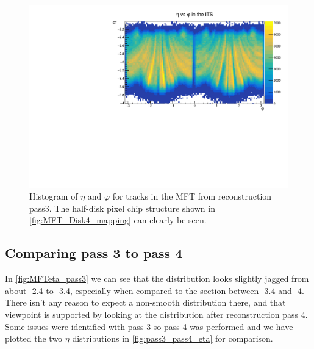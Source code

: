 \begin{figure}[h]
    \begin{center}
        \includegraphics[width=.8\textwidth]{Plots/pass3_MFT/eta_phi_pass3.pdf}
        \caption[$\eta$-$\varphi$ histogram for tracks from pass 3 in the MFT]{Histogram of $\eta$ and $\varphi$ for tracks in the MFT from reconstruction pass3. The half-disk pixel chip structure shown in \cref{fig:MFT_Disk4_mapping} can clearly be seen.}
        \label{fig:eta_phi_pass3}
    \end{center}
\end{figure}

\subsection{Comparing pass 3 to pass 4}\label{sec:Comparing}
In \cref{fig:MFTeta_pass3} we can see that the distribution looks slightly jagged from about -2.4 to -3.4, especially when compared to the section between -3.4 and -4. There isn't any reason to expect a non-smooth distribution there, and that viewpoint is supported by looking at the distribution after reconstruction pass 4. Some issues were identified with pass 3 so pass 4 was performed and we have plotted the two $\eta$ distributions in \cref{fig:pass3_pass4_eta} for comparison.

